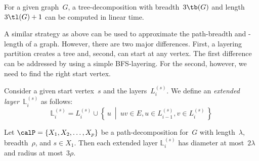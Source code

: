 \begin{corollary}
For a given graph~\( G \), a tree-decomposition with breadth~\( 3 \tb(G) \) and length~\( 3 \tl(G) + 1 \) can be computed in linear time.
\end{corollary}

A similar strategy as above can be used to approximate the path-breadth and -length of a graph.
However, there are two major differences.
First, a layering partition creates a tree and, second, can start at any vertex.
The first difference can be addressed by using a simple BFS-layering.
For the second, however, we need to find the right start vertex.

Consider a given start vertex~$s$ and the layers~$L_i^{(s)}$.
We define an \emph{extended layer~\( \mathbb{L}_i^{(s)} \)} as follows:
\[
    \mathbb{L}_i^{(s)} = L_{i}^{(s)} \cup \left \{ \, u \ \middle| \ uv \in E, u \in L_{i-1}^{(s)}, v \in L_{i}^{(s)} \, \right \}
\]

\begin{lemma}
    \label{lem:bfsLayApproxDist}
Let \( \calP = \{ X_1, X_2, \ldots, X_p \} \) be a path-decomposition for~\( G \) with length~\( \lambda \), breadth~\( \rho \), and \( s \in X_1 \).
Then each extended layer \( \mathbb{L}_i^{(s)} \) has diameter at most~\( 2 \lambda \) and radius at most~\( 3 \rho \).
\end{lemma}

